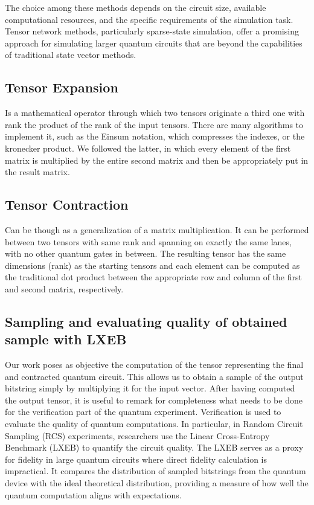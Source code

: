 \documentclass[12pt,oneside,a4paper]{article}
\begin{document}
The choice among these methods depends on the circuit size, available computational resources, and the specific requirements of the simulation task. Tensor network methods, particularly sparse-state simulation, offer a promising approach for simulating larger quantum circuits that are beyond the capabilities of traditional state vector methods.



\subsection{Tensor Expansion}
Is a mathematical operator through which two tensors originate a third one with rank the product of the rank of the input tensors. There are many algorithms to implement it, such as the Einsum notation, which compresses the indexes, or the kronecker product. We followed the latter, in which every element of the first matrix is multiplied by the entire second matrix and then be appropriately put in the result matrix.

\subsection{Tensor Contraction}
Can be though as a generalization of a matrix multiplication. It can be performed between two tensors with same rank and spanning on exactly the same lanes, with no other quantum gates in between. The resulting tensor has the same dimensions (rank) as the starting tensors and each element can be computed as the traditional dot product between the appropriate row and column of the first and second matrix, respectively.


\subsection{Sampling and evaluating quality of obtained sample with LXEB}
Our work poses as objective the computation of the tensor representing the final and contracted quantum circuit. This allows us to obtain a sample of the output bitstring simply by multiplying it for the input vector. After having computed the output tensor, it is useful to remark for completeness what needs to be done for the verification part of the quantum experiment. Verification is used to evaluate the quality of quantum computations. In particular, in Random Circuit Sampling (RCS) experiments, researchers use the Linear Cross-Entropy Benchmark (LXEB) to quantify the circuit quality. The LXEB serves as a proxy for fidelity in large quantum circuits where direct fidelity calculation is impractical. It compares the distribution of sampled bitstrings from the quantum device with the ideal theoretical distribution, providing a measure of how well the quantum computation aligns with expectations.
\end{document}
